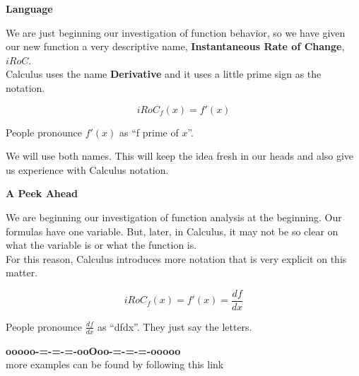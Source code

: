\documentclass{ximera}
\begin{document}
\begin{notation} \textbf{\textcolor{blue!55!black}{Language}} 


We are just beginning our investigation of function behavior, so we have given our new function a very descriptive name, \textbf{\textcolor{blue!55!black}{Instantaneous Rate of Change}},  \textbf{\textcolor{blue!55!black}{$iRoC$}}. \\


Calculus uses the name \textbf{\textcolor{blue!55!black}{Derivative}} and it uses a little prime sign as the notation.



\[
iRoC_f(x) = f'(x)
\]


People pronounce $f'(x)$ as ``f prime of $x$''.


\end{notation}

We will use both names.  This will keep the idea fresh in our heads and also give us experience with Calculus notation.






\begin{notation} \textbf{\textcolor{red!70!black}{A Peek Ahead}}


We are beginning our investigation of function analysis at the beginning.  Our formulas have one variable.  But, later, in Calculus, it may not be so clear on what the variable is or what the function is. \\

For this reason, Calculus introduces more notation that is very explicit on this matter.



\[
iRoC_f(x) = f'(x) = \frac{df}{dx}
\]


People pronounce $\frac{df}{dx}$ as ``dfdx''.  They just say the letters.


\end{notation}






















\begin{center}
\textbf{\textcolor{green!50!black}{ooooo-=-=-=-ooOoo-=-=-=-ooooo}} \\

more examples can be found by following this link\\ 

\end{center}
\end{document}
